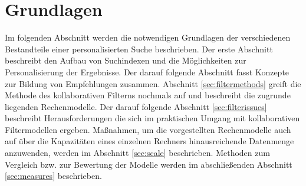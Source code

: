\section{Grundlagen} %

Im folgenden Abschnitt werden die notwendigen Grundlagen der verschiedenen Bestandteile einer personalisierten Suche beschrieben. Der erste Abschnitt beschreibt den Aufbau von Suchindexen und die Möglichkeiten zur Personalisierung der Ergebnisse. Der darauf folgende Abschnitt fasst Konzepte zur Bildung von Empfehlungen zusammen. Abschnitt \ref{sec:filtermethods} greift die Methode des kollaborativen Filterns nochmals auf und beschreibt die zugrunde liegenden Rechenmodelle. Der darauf folgende Abschnitt \ref{sec:filterissues} beschreibt Herausforderungen die sich im praktischen Umgang mit kollaborativen Filtermodellen ergeben. Maßnahmen, um die vorgestellten Rechenmodelle auch auf über die Kapazitäten eines einzelnen Rechners hinausreichende Datenmenge anzuwenden, werden im Abschnitt \ref{sec:scale} beschrieben. Methoden zum Vergleich bzw. zur Bewertung der Modelle werden im abschließenden Abschnitt \ref{sec:measures}  beschrieben.






